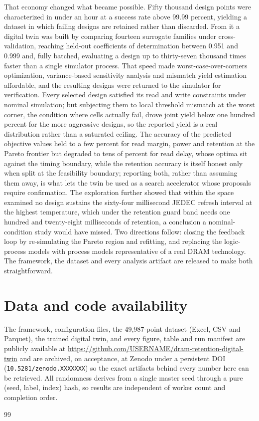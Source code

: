 \documentclass[11pt,a4paper]{article}
\begin{document}
That economy changed what became possible. Fifty thousand design points were
characterized in under an hour at a success rate above 99.99 percent, yielding a
dataset in which failing designs are retained rather than discarded. From it a
digital twin was built by comparing fourteen surrogate families under
cross-validation, reaching held-out coefficients of determination between 0.951 and
0.999 and, fully batched, evaluating a design up to thirty-seven thousand times
faster than a single simulator process. That speed made worst-case-over-corners
optimization, variance-based sensitivity analysis and mismatch yield estimation
affordable, and the resulting designs were returned to the simulator for
verification. Every selected design satisfied its read and write constraints under
nominal simulation; but subjecting them to local threshold mismatch at the worst
corner, the condition where cells actually fail, drove joint yield below one hundred
percent for the more aggressive designs, so the reported yield is a real
distribution rather than a saturated ceiling. The accuracy of the predicted
objective values held to a few percent for read margin, power and retention at the
Pareto frontier but degraded to tens of percent for read delay, whose optima sit
against the timing boundary, while the retention accuracy is itself honest only when
split at the feasibility boundary; reporting both, rather than assuming them away,
is what lets the twin be used as a search accelerator whose proposals require
confirmation. The exploration further showed that within the space
examined no design sustains the sixty-four millisecond JEDEC refresh interval at the
highest temperature, which under the retention guard band needs one hundred and
twenty-eight milliseconds of retention, a conclusion a nominal-condition study would
have missed. Two
directions follow: closing the feedback loop by re-simulating the Pareto region and
refitting, and replacing the logic-process models with process models
representative of a real DRAM technology. The framework, the dataset and every
analysis artifact are released to make both straightforward.

\section*{Data and code availability}

The framework, configuration files, the 49,987-point dataset (Excel, CSV and
Parquet), the trained digital twin, and every figure, table and run manifest are
publicly available at
\url{https://github.com/USERNAME/dram-retention-digital-twin} and are archived, on
acceptance, at Zenodo under a persistent DOI (\texttt{10.5281/zenodo.XXXXXXX}) so the
exact artifacts behind every number here can be retrieved. All randomness derives
from a single master seed through a pure (seed, label, index) hash, so results are
independent of worker count and completion order.

\begin{thebibliography}{99}

\end{thebibliography}
\end{document}
